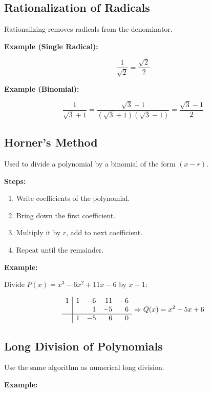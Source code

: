 \subsection{Rationalization of Radicals}

Rationalizing removes radicals from the denominator.
\vspace{\baselineskip}

\textbf{Example (Single Radical):}

\[
  \frac{1}{\sqrt{2}} = \frac{\sqrt{2}}{2}
\]

\textbf{Example (Binomial):}

\[
  \frac{1}{\sqrt{3} + 1} = \frac{\sqrt{3} - 1}{(\sqrt{3} + 1)(\sqrt{3} - 1)} = \frac{\sqrt{3} - 1}{2}
\]

\subsection{Horner’s Method}

Used to divide a polynomial by a binomial of the form \((x - r)\).
\vspace{\baselineskip}

\textbf{Steps:}
\begin{enumerate}
    \item Write coefficients of the polynomial.
    \item Bring down the first coefficient.
    \item Multiply it by \(r\), add to next coefficient.
    \item Repeat until the remainder.
\end{enumerate}

\textbf{Example:}
\vspace{\baselineskip}

Divide \(P(x) = x^3 - 6x^2 + 11x - 6\) by \(x - 1\):

\[
  \begin{array}{r|rrrr}
  1 & 1 & -6 & 11 & -6 \\
    &   & 1 & -5 & 6 \\
  \hline
    & 1 & -5 & 6 & 0 \\
  \end{array}
  \Rightarrow Q(x) = x^2 - 5x + 6
\]

\subsection{Long Division of Polynomials}

Use the same algorithm as numerical long division.
\vspace{\baselineskip}

\textbf{Example:}

\bigskip
{}
